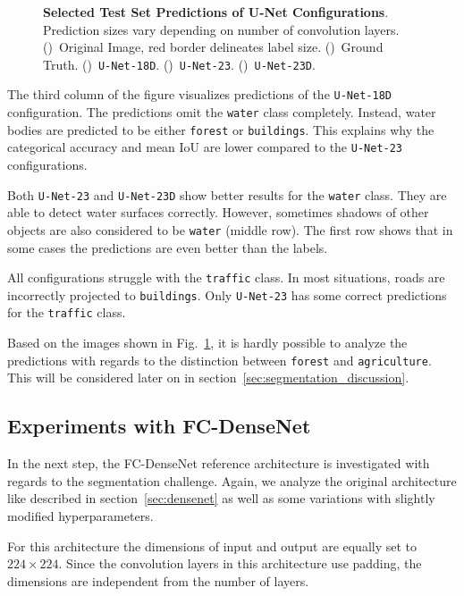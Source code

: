 \begin{figure}[h]
    \caption[Selected Test Set Predictions of U-Net Configurations]
    {\textbf{Selected Test Set Predictions of U-Net Configurations}. Prediction sizes vary depending on number of convolution layers.
    ()~Original Image, red border delineates label size.
    ()~Ground Truth.
    ()~\texttt{U-Net-18D}.
    ()~\texttt{U-Net-23}.
    ()~\texttt{U-Net-23D}.}
    \label{fig:unet_prediction_images}
\end{figure}

The third column of the figure visualizes predictions of the \texttt{U-Net-18D} configuration. The predictions omit the \texttt{water} class completely. Instead, water bodies are predicted to be either \texttt{forest} or \texttt{buildings}. This explains why the categorical accuracy and mean IoU are lower compared to the \texttt{U-Net-23} configurations.

Both \texttt{U-Net-23} and \texttt{U-Net-23D} show better results for the \texttt{water} class. They are able to detect water surfaces correctly. However, sometimes shadows of other objects are also considered to be \texttt{water} (middle row). The first row shows that in some cases the predictions are even better than the labels.

All configurations struggle with the \texttt{traffic} class. In most situations, roads are incorrectly projected to \texttt{buildings}. Only \texttt{U-Net-23} has some correct predictions for the \texttt{traffic} class.

Based on the images shown in Fig.~\ref{fig:unet_prediction_images}, it is hardly possible to analyze the predictions with regards to the distinction between \texttt{forest} and \texttt{agriculture}. This will be considered later on in section~\ref{sec:segmentation_discussion}.

\subsection{Experiments with FC-DenseNet}
\label{sec:densenet_experiments}
In the next step, the FC-DenseNet reference architecture is investigated with regards to the segmentation challenge. Again, we analyze the original architecture like described in section~\ref{sec:densenet} as well as some variations with slightly modified hyperparameters.

For this architecture the dimensions of input and output are equally set to $224\times 224$. Since the convolution layers in this architecture use padding, the dimensions are independent from the number of layers.

